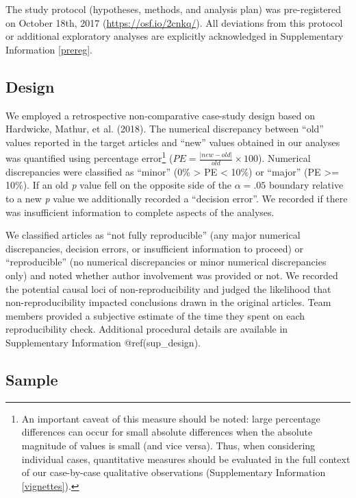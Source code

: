 \documentclass[english,,man,floatsintext]{apa6}
\begin{document}
The study protocol (hypotheses, methods, and analysis plan) was pre-registered on October 18th, 2017 (\url{https://osf.io/2cnkq/}). All deviations from this protocol or additional exploratory analyses are explicitly acknowledged in Supplementary Information \ref{prereg}.

\hypertarget{design}{%
\subsection{Design}\label{design}}

We employed a retrospective non-comparative case-study design based on Hardwicke, Mathur, et al. (2018). The numerical discrepancy between \enquote{old} values reported in the target articles and \enquote{new} values obtained in our analyses was quantified using percentage error\footnote{An important caveat of this measure should be noted: large percentage differences can occur for small absolute differences when the absolute magnitude of values is small (and vice versa). Thus, when considering individual cases, quantitative measures should be evaluated in the full context of our case-by-case qualitative observations (Supplementary Information \ref{vignettes}).} (\(PE = \frac{|new-old|}{old}\times100\)). Numerical discrepancies were classified as \enquote{minor} (0\% \textgreater{} PE \textless{} 10\%) or \enquote{major} (PE \textgreater{}= 10\%). If an old \emph{p} value fell on the opposite side of the \(\alpha = .05\) boundary relative to a new \emph{p} value we additionally recorded a \enquote{decision error}. We recorded if there was insufficient information to complete aspects of the analyses.

We classified articles as \enquote{not fully reproducible} (any major numerical discrepancies, decision errors, or insufficient information to proceed) or \enquote{reproducible} (no numerical discrepancies or minor numerical discrepancies only) and noted whether author involvement was provided or not. We recorded the potential causal loci of non-reproducibility and judged the likelihood that non-reproducibility impacted conclusions drawn in the original articles. Team members provided a subjective estimate of the time they spent on each reproducibility check. Additional procedural details are available in Supplementary Information @ref(sup\_design).

\hypertarget{sample}{%
\subsection{Sample}\label{sample}}
\end{document}
